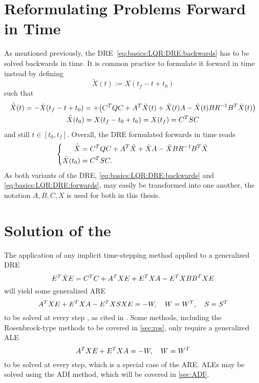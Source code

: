 \section{Reformulating Problems Forward in Time}
\label{sec:basics:tdir}

As mentioned previously, the \ac{DRE}~\eqref{eq:basics:LQR:DRE:backwards} has to be solved backwards in time.
It is common practice to formulate it forward in time instead by defining
\begin{equation}
  \tilde X(t) := X(t_f - t + t_0)
\end{equation}
such that
\begin{equation}
\begin{gathered}
  \dot{\tilde X}(t)
  = - \dot X(t_f - t + t_0)
  = + \big( C^T Q C + A^T \tilde X(t) + \tilde X(t) A - \tilde X(t) B R^{-1} B^T \tilde X(t) \big)
  \\
  \tilde X(t_0)
  = X(t_f - t_0 + t_0)
  = X(t_f)
  = C^T S C
\end{gathered}
\end{equation}
and still $t \in [t_0, t_f]$.
Overall,
the \ac{DRE} formulated forwards in time reads
\begin{equation}
\label{eq:basics:LQR:DRE:forwards}
\left\{
\begin{aligned}
  \dot{\tilde X} &= C^T Q C + A^T \tilde X + \tilde X A - \tilde X B R^{-1} B^T \tilde X \\
  \tilde X(t_0) &= C^T S C
  .
\end{aligned}
\right.
\end{equation}
As both variants of the \ac{DRE},
\eqref{eq:basics:LQR:DRE:backwards} and
\eqref{eq:basics:LQR:DRE:forwards},
may easily be transformed into one another,
the notation $A, B, C, X$ is used for both in this thesis.

\section{Solution of the \texorpdfstring{}{DRE}}
\label{sec:basics:matrixeqs}

The application of
any implicit time-stepping method applied to a generalized \ac{DRE}
\begin{equation}
\label{eq:basics:DRE}
  E^T \dot X E = C^T C + A^T X E + E^T X A - E^T X BB^T X E
\end{equation}
will yield some generalized \ac{ARE}
\begin{equation}
\label{eq:basics:ARE}
    A^T X E + E^T X A - E^T X S X E = -W,
    \quad
    W = W^T,
    \quad
    S = S^T
\end{equation}
to be solved at every step \cite{Dieci1992},
as cited in \cite[50]{Lang2015}.
Some methods, including the Rosenbrock-type methods to be covered in \autoref{sec:ros},
only require a generalized \ac{ALE}
\begin{equation}
\label{eq:basics:ALE}
  A^T X E + E^T X A = -W,
  \quad
  W = W^T
\end{equation}
to be solved at every step,
which is a special case of the \ac{ARE}.
\acp{ALE} may be solved \eg using the \ac{ADI} method,
which will be covered in \autoref{sec:ADI}.


